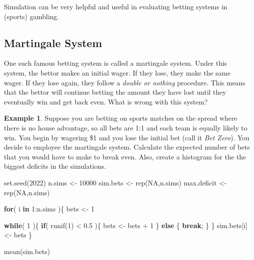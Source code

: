 \documentclass[
  11pt,
]{book}
\newenvironment{Shaded}{\begin{snugshade}}{\end{snugshade}}
\newcommand{\ConstantTok}[1]{\textcolor[rgb]{0.00,0.00,0.00}{#1}}
\newcommand{\ControlFlowTok}[1]{\textcolor[rgb]{0.13,0.29,0.53}{\textbf{#1}}}
\newcommand{\DecValTok}[1]{\textcolor[rgb]{0.00,0.00,0.81}{#1}}
\newcommand{\FloatTok}[1]{\textcolor[rgb]{0.00,0.00,0.81}{#1}}
\newcommand{\FunctionTok}[1]{\textcolor[rgb]{0.00,0.00,0.00}{#1}}
\newcommand{\NormalTok}[1]{#1}
\newcommand{\OtherTok}[1]{\textcolor[rgb]{0.56,0.35,0.01}{#1}}
\newcommand{\SpecialCharTok}[1]{\textcolor[rgb]{0.00,0.00,0.00}{#1}}
\theoremstyle{definition}
\theoremstyle{definition}
\newtheorem{example}{Example}[chapter]
\theoremstyle{definition}
\theoremstyle{definition}
\theoremstyle{remark}
\begin{document}
Simulation can be very helpful and useful in evaluating betting systems in (sports) gambling.

\hypertarget{martingale-system}{%
\subsection{Martingale System}\label{martingale-system}}

One such famous betting system is called a martingale system. Under this system, the bettor makes an initial wager. If they lose, they make the same wager. If they lose again, they follow a \emph{double or nothing} procedure. This means that the bettor will continue betting the amount they have lost until they eventually win and get back even. What is wrong with this system?

\begin{example}
Suppose you are betting on sports matches on the spread where there is no house advantage, so all bets are 1:1 and each team is equally likely to win. You begin by wagering \$1 and you lose the initial bet (call it \emph{Bet Zero}). You decide to employee the martingale system. Calculate the expected number of bets that you would have to make to break even. Also, create a histogram for the the biggest deficits in the simulations.
\end{example}

\begin{Shaded}
\begin{Highlighting}[]
\FunctionTok{set.seed}\NormalTok{(}\DecValTok{2022}\NormalTok{)}
\NormalTok{n.sims }\OtherTok{\textless{}{-}} \DecValTok{10000}
\NormalTok{sim.bets }\OtherTok{\textless{}{-}} \FunctionTok{rep}\NormalTok{(}\ConstantTok{NA}\NormalTok{,n.sims)}
\NormalTok{max.deficit }\OtherTok{\textless{}{-}} \FunctionTok{rep}\NormalTok{(}\ConstantTok{NA}\NormalTok{,n.sims)}

\ControlFlowTok{for}\NormalTok{( i }\ControlFlowTok{in} \DecValTok{1}\SpecialCharTok{:}\NormalTok{n.sims )\{}
\NormalTok{  bets }\OtherTok{\textless{}{-}} \DecValTok{1}
  
  \ControlFlowTok{while}\NormalTok{( }\DecValTok{1}\NormalTok{ )\{}
    \ControlFlowTok{if}\NormalTok{( }\FunctionTok{runif}\NormalTok{(}\DecValTok{1}\NormalTok{) }\SpecialCharTok{\textless{}} \FloatTok{0.5}\NormalTok{ )\{}
\NormalTok{      bets }\OtherTok{\textless{}{-}}\NormalTok{ bets }\SpecialCharTok{+} \DecValTok{1}
\NormalTok{    \} }\ControlFlowTok{else}\NormalTok{ \{}
      \ControlFlowTok{break}\NormalTok{;}
\NormalTok{    \}}
\NormalTok{  \}}
\NormalTok{  sim.bets[i] }\OtherTok{\textless{}{-}}\NormalTok{ bets}
\NormalTok{\}}

\FunctionTok{mean}\NormalTok{(sim.bets)}
\end{Highlighting}
\end{Shaded}
\end{document}
